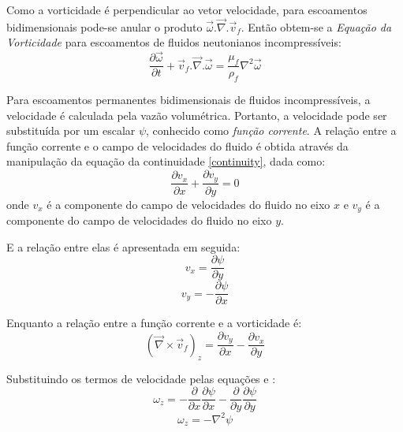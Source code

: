 Como a vorticidade é perpendicular ao vetor velocidade, para escoamentos bidimensionais pode-se anular o produto $\vec{\omega}.\vec{\nabla}.\vec{v}_f$\cite{pontes_norberto}.
Então obtem-se a \textit{Equação da Vorticidade} para escoamentos de fluidos neutonianos incompressíveis:
\begin{equation}
	\dfrac{\partial \vec{\omega}}{\partial t} +
	\vec{v}_f.\vec{\nabla}.\vec{\omega} =
    \dfrac{\mu_f}{\rho_f} \nabla^2 \vec{\omega}
    \label{vorticity}
\end{equation}

Para escoamentos permanentes bidimensionais de fluidos incompressíveis, a velocidade é calculada pela vazão volumétrica.
Portanto, a velocidade pode ser substituída por um escalar $\psi$, conhecido como \textit{função corrente}.
A relação entre a função corrente e o campo de velocidades do fluido é obtida através da manipulação da equação da continuidade \eqref{continuity}, dada como:
\begin{equation}
	\dfrac{\partial v_x}{\partial x} +
	\dfrac{\partial v_y}{\partial y} =
	0
\end{equation}
onde $v_x$ é a componente do campo de velocidades do fluido no eixo $x$ e $v_y$ é a componente do campo de velocidades do fluido no eixo $y$.

E a relação entre elas é apresentada em seguida:
\begin{equation}
	v_x = \dfrac{\partial \psi}{\partial y}
	\label{corr_x}
\end{equation}
\begin{equation}
	v_y = -\dfrac{\partial \psi}{\partial x}
	\label{corr_y}
\end{equation}

Enquanto a relação entre a função corrente e a vorticidade é:
\begin{equation}
	(\vec{\nabla}\times\vec{v}_f)_z =
	\dfrac{\partial v_y}{\partial x} -
	\dfrac{\partial v_x}{\partial y}
\end{equation}

Substituindo os termos de velocidade pelas equações  e :
\begin{equation}
	\omega_z =
	-\dfrac{\partial}{\partial x}\dfrac{\partial \psi}{\partial x} -
	\dfrac{\partial}{\partial y}\dfrac{\partial \psi}{\partial y}
\end{equation}
\begin{equation}
	\omega_z =
	-\nabla^2\psi
	\label{corrente_vorticidade}
\end{equation}

